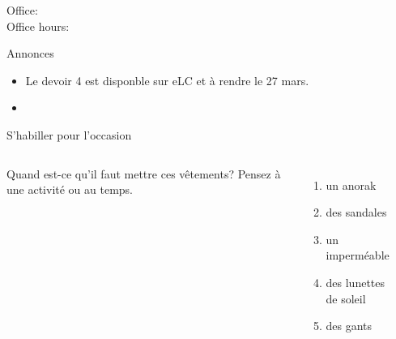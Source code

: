 \documentclass{beamer}
\subtitle[Nécessité]{Les expressions de nécessité}
\begin{document}
  \begin{frame}
    \titlepage
    \tiny{Office: \\
          Office hours: }
  \end{frame}

  \begin{frame}{Annonces}
    \begin{itemize}
      \item Le devoir 4 est disponble sur eLC et à rendre le 27 mars.
      \item[] 
    \end{itemize}
  \end{frame}

  \begin{frame}{S'habiller pour l'occasion}
    \begin{columns}
        Quand est-ce qu'\alert{il faut mettre} ces vêtements?
        Pensez à une activité ou au temps.
        \begin{enumerate}
          \item un anorak
          \item<2-> des sandales
          \item<3-> un imperméable
          \item<4-> des lunettes de soleil
          \item<5-> des gants
        \end{enumerate}
        \begin{minipage}[c][0.8\textheight]{\linewidth}
          \begin{center}
          \end{center}
        \end{minipage}
    \end{columns}
  \end{frame}
\end{document}
